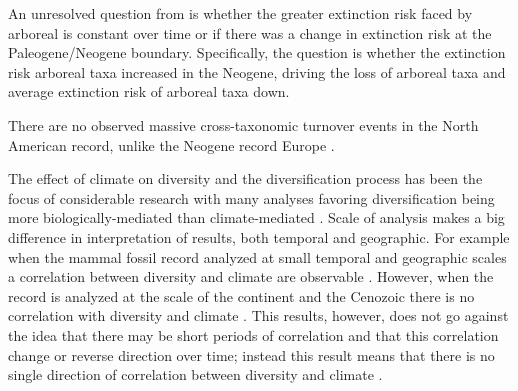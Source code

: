 \documentclass[12pt,letterpaper]{article}
\begin{document}
An unresolved question from \citet{Smits2015b} is whether the greater extinction risk faced by arboreal is constant over time or if there was a change in extinction risk at the Paleogene/Neogene boundary. Specifically, the question is whether the extinction risk arboreal taxa increased in the Neogene, driving the loss of arboreal taxa and average extinction risk of arboreal taxa down. 

There are no observed massive cross-taxonomic turnover events in the North American record, unlike the Neogene record Europe \citep{Alroy2009,Alroy1996a,Eronen2015,Janis1993a,Alroy2000g}.





The effect of climate on diversity and the diversification process has been the focus of considerable research with many analyses favoring diversification being more biologically-mediated than climate-mediated \citep{Alroy1996a,Alroy2000g,Figueirido2012,Clyde1998a}. Scale of analysis makes a big difference in interpretation of results, both temporal and geographic. For example when the mammal fossil record analyzed at small temporal and geographic scales a correlation between diversity and climate are observable \citep{Clyde1998a}. However, when the record is analyzed at the scale of the continent and the Cenozoic there is no correlation with diversity and climate \citep{Alroy2000g}. This results, however, does not go against the idea that there may be short periods of correlation and that this correlation change or reverse direction over time; instead this result means that there is no single direction of correlation between diversity and climate \citep{Figueirido2012}. 
\end{document}
